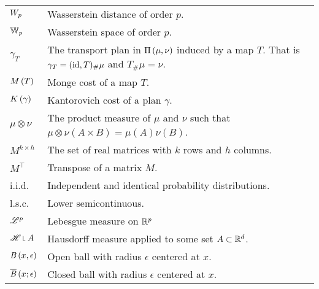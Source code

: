 \begin{tabular}{ l l }
	$W_{p}$ & Wasserstein distance of order $p$. \\	
	$\mathbb{W}_{p}$ & Wasserstein space of order $p$.\\
 	$\gamma_T$ & The transport plan in $\Pi\left(\mu, \nu\right)$ induced by a map $T$. That is $\gamma_T = (\mathrm{id}, T)_\#\mu$ and $T_\#\mu=\nu$. \\
	$M\left(T\right)$ & Monge cost of a map $T$. \\
	$K\left(\gamma\right)$ & Kantorovich cost of a plan $\gamma$. \\	
	$\mu \otimes \nu$ & The product measure of $\mu$ and $\nu$ such that $\mu \otimes \nu (A\times B)= \mu(A)\nu(B)$.\\
	$M^{k\times h}$ & The set of real matrices with $k$ rows and $h$ columns. \\
	$M^\top$ & Transpose of a matrix $M$. \\
	i.i.d. & Independent and identical probability distributions.\\
	l.s.c. & Lower semicontinuous. \\
	$\mathscr{L}^p$ & Lebesgue measure on $\mathbb{R}^p$\\
	$\Hausdorff\measurerestr A$ & Hausdorff measure applied to some set $A \subset \mathbb{R}^d$. \\
	$\mathit{B}\left( x, \epsilon \right)$ & Open ball with radius $\epsilon$ centered at $x$.\\
	$\overline{\mathit{B}}\left( x;\epsilon \right) $ & Closed ball with radius $\epsilon$ centered at $x$.\\	
\end{tabular}
